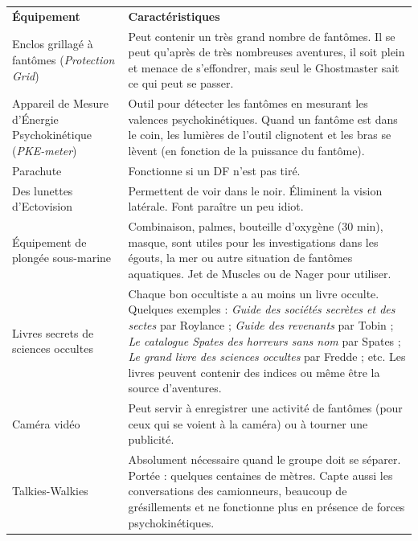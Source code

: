 \begin{frame}[b]
{\begin{minipage}[c][0.95\textheight][c]{\linewidth}
\end{minipage}
}{%
\begin{minipage}[c][0.95\textheight][c]{\linewidth}
\begin{center}
\begin{tabular}{>{\raggedright\arraybackslash}p{1.8cm} p{6cm}}
\textbf{Équipement} & \textbf{Caractéristiques}\\
Enclos grillagé à fantômes (\textit{Protection Grid}) & Peut contenir un très grand nombre de fantômes. Il se peut qu'après de très nombreuses aventures, il soit plein et menace de s'effondrer, mais seul le Ghostmaster sait ce qui peut se passer. \\
Appareil de Mesure d'Énergie Psychokinétique (\textit{PKE-meter}) & Outil pour détecter les fantômes en mesurant les valences psychokinétiques. Quand un fantôme est dans le coin, les lumières de l'outil clignotent et les bras se lèvent (en fonction de la puissance du fantôme). \\
Parachute & Fonctionne si un DF n'est pas tiré. \\
Des lunettes d'Ectovision & Permettent de voir dans le noir. Éliminent la vision latérale. Font paraître un peu idiot.\\
Équipement de plongée sous-marine & Combinaison, palmes, bouteille d'oxygène (30 min), masque, sont utiles pour les investigations dans les égouts, la mer ou autre situation de fantômes aquatiques. Jet de Muscles ou de Nager pour utiliser. \\
Livres secrets de sciences occultes & Chaque bon occultiste a au moins un livre occulte. Quelques exemples : \textit{Guide des sociétés secrètes et des sectes} par Roylance ; \textit{Guide des revenants} par Tobin ; \textit{Le catalogue Spates des horreurs sans nom} par Spates ; \textit{Le grand livre des sciences occultes} par Fredde ; etc. Les livres peuvent contenir des indices ou même être la source d'aventures. \\
Caméra vidéo & Peut servir à enregistrer une activité de fantômes (pour ceux qui se voient à la caméra) ou à tourner une publicité. \\
Talkies-Walkies & Absolument nécessaire quand le groupe doit se séparer. Portée : quelques centaines de mètres. Capte aussi les conversations des camionneurs, beaucoup de grésillements et ne fonctionne plus en présence de forces psychokinétiques. \\
\end{tabular}
\end{center}


\end{minipage}}
\end{frame}
